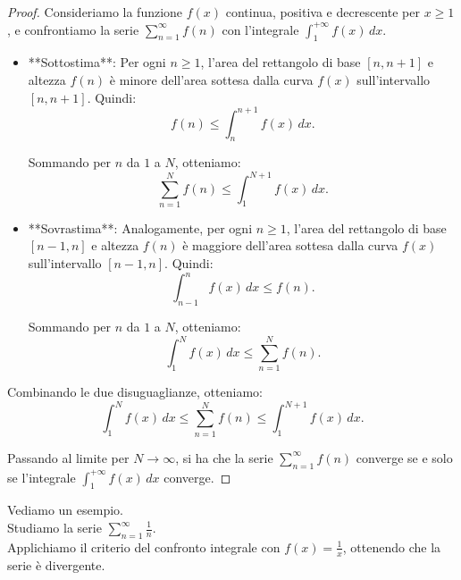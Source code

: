 \begin{proof}
  Consideriamo la funzione $f(x)$ continua, positiva e decrescente per $x \geq 1$, e confrontiamo la serie $\sum_{n=1}^{\infty} f(n)$ con l'integrale $\int_{1}^{+\infty} f(x) \, dx$.

  \begin{itemize}
    \item **Sottostima**: Per ogni $n \geq 1$, l'area del rettangolo di base $[n, n+1]$ e altezza $f(n)$ è minore dell'area sottesa dalla curva $f(x)$ sull'intervallo $[n, n+1]$. Quindi:
    \[
    f(n) \leq \int_{n}^{n+1} f(x) \, dx.
    \]

    Sommando per $n$ da $1$ a $N$, otteniamo:
    \[
    \sum_{n=1}^{N} f(n) \leq \int_{1}^{N+1} f(x) \, dx.
    \]

    \item **Sovrastima**: Analogamente, per ogni $n \geq 1$, l'area del rettangolo di base $[n-1, n]$ e altezza $f(n)$ è maggiore dell'area sottesa dalla curva $f(x)$ sull'intervallo $[n-1, n]$. Quindi:
    \[
    \int_{n-1}^{n} f(x) \, dx \leq f(n).
    \]

    Sommando per $n$ da $1$ a $N$, otteniamo:
    \[
    \int_{1}^{N} f(x) \, dx \leq \sum_{n=1}^{N} f(n).
    \]
  \end{itemize}

  Combinando le due disuguaglianze, otteniamo:
  \[
  \int_{1}^{N} f(x) \, dx \leq \sum_{n=1}^{N} f(n) \leq \int_{1}^{N+1} f(x) \, dx.
  \]

  Passando al limite per $N \to \infty$, si ha che la serie $\sum_{n=1}^{\infty} f(n)$ converge se e solo se l'integrale $\int_{1}^{+\infty} f(x) \, dx$ converge.
\end{proof}
Vediamo un esempio.\\

Studiamo la serie $\sum_{n=1}^{\infty} \frac{1}{n}$.\\
Applichiamo il criterio del confronto integrale con $f(x) = \frac{1}{x}$, ottenendo che la serie è divergente.\\

